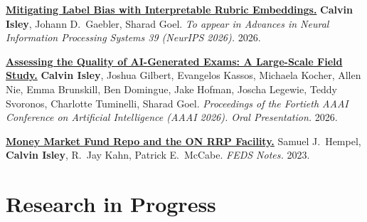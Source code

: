 \documentclass[11pt]{article}
\begin{document}
\begin{enumerate}[leftmargin=2.2em, label={[\arabic*]}, itemsep=5pt, topsep=0pt]

  \item \textbf{\href{https://arxiv.org/abs/2605.21455}{Mitigating Label Bias with Interpretable Rubric Embeddings.}}
  \textbf{Calvin Isley}, Johann D.\ Gaebler, Sharad Goel.
  \textit{To appear in Advances in Neural Information Processing Systems 39 (NeurIPS 2026).} 2026.

  \item \textbf{\href{https://ojs.aaai.org/index.php/AAAI/article/view/41205}{Assessing the Quality of AI-Generated Exams: A Large-Scale Field Study.}}
  \textbf{Calvin Isley}, Joshua Gilbert, Evangelos Kassos, Michaela Kocher, Allen Nie, Emma Brunskill,
  Ben Domingue, Jake Hofman, Joscha Legewie, Teddy Svoronos, Charlotte Tuminelli, Sharad Goel.
  \textit{Proceedings of the Fortieth AAAI Conference on Artificial Intelligence (AAAI 2026).
  Oral Presentation.} 2026.

  \item \textbf{\href{https://www.federalreserve.gov/econres/notes/feds-notes/money-market-fund-repo-and-the-on-rrp-facility-20231215.html}{Money Market Fund Repo and the ON RRP Facility.}}
  Samuel J.\ Hempel, \textbf{Calvin Isley}, R.\ Jay Kahn, Patrick E.\ McCabe.
  \textit{FEDS Notes.} 2023.

\end{enumerate}

\section*{Research in Progress}
\end{document}
